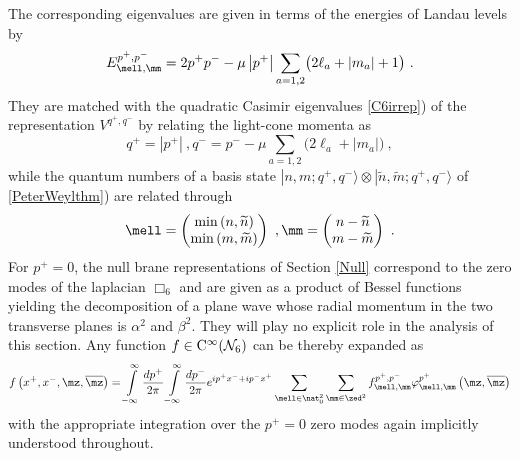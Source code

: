 The corresponding eigenvalues are given in terms of the energies of
Landau levels by
\begin{equation}
E_{\mell,\mm}^{p^+,p^-}=2p^+p^--\mu \left|p^+\right| 
\sum_{a=1,2}\bigl(2\ell_a+|m_a|+1\bigr) \ .
\label{Landaulevels}\end{equation}
They are matched with the quadratic Casimir eigenvalues
\eqref{C6irrep}) of the representation $V^{q^+,q^-}$ by relating the
light-cone momenta as
\begin{equation}
q^+=\left|p^+\right| \ ,    q^-=p^--\mu \sum_{a=1,2}\bigl(2\ell_a+
|m_a|\bigr) \ ,
\label{momid}\end{equation}
while the quantum numbers of a basis state
$|n,m;q^+,q^-\rangle\otimes|\widetilde{n},\widetilde{m} ;q^+,q^-\rangle$
of \eqref{PeterWeylthm}) are related through
\begin{equation}
\mell=\begin{pmatrix}\min\left(n,\widetilde{n} \right)\\
\min\left(m,\widetilde{m} \right)\end{pmatrix} \ ,   
\mm=\begin{pmatrix}n-\widetilde{n} \\m-\widetilde{m} 
\end{pmatrix} \ .
\label{quantnumid}\end{equation}
For $p^+=0$, the null brane representations of
Section \ref{Null} correspond to the zero modes of the laplacian
$\Box_6$ and are given as a product of Bessel functions yielding the
decomposition of a plane wave whose radial momentum in the two
transverse planes is $\alpha^2$ and $\beta^2$. They will play no
explicit role in the analysis of this section. Any function $f\in{\rm
  C}^\infty(\mathcal{N}_6)$ can be thereby expanded as
\begin{equation}
f\left(x^+,x^-,\mz,\overline{\mz} \right)=\int\limits_{-\infty}^\infty
\frac{ d p^+}{2\pi} \int\limits_{-\infty}^\infty
\frac{ d p^-}{2\pi}  e^{ i p^+x^-+ i
  p^-x^+} \sum_{\mell\in\nat_0^2} \sum_{\mm\in\zed^2}f_{\mell,\mm}^{p^+,p^-} 
\varphi^{p^+}_{\mell,\mm}\left(\mz,\overline{\mz} \right)
\label{fNW6exp}\end{equation}
with the appropriate integration over the $p^+=0$ zero modes again
implicitly understood throughout.

